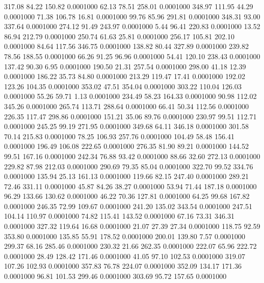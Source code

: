  317.08   84.22  150.82   0.0001000
  62.13   78.51  258.01   0.0001000
 348.97  111.95   44.29   0.0001000
  71.38  106.78   16.81   0.0001000
  99.76   85.96  291.81   0.0001000
 348.31   93.00  337.64   0.0001000
 274.12   91.49  243.97   0.0001000
   5.44   96.41  220.83   0.0001000
  13.52   86.94  212.79   0.0001000
 250.74   61.63   25.81   0.0001000
 256.17  105.81  202.10   0.0001000
  84.64  117.56  346.75   0.0001000
 138.82   80.44  327.89   0.0001000
 239.82   78.56  188.55   0.0001000
  66.26   91.25   96.96   0.0001000
  54.41  120.10  238.43   0.0001000
 137.42   90.30    6.95   0.0001000
 190.50   21.31  257.54   0.0001000
 298.00   41.18   12.39   0.0001000
 186.22   35.73   84.80   0.0001000
 213.29  119.47   17.41   0.0001000
 192.02  123.26  104.35   0.0001000
 353.02   47.51  354.04   0.0001000
 303.22  110.04  126.03   0.0001000
  55.26   59.71    1.13   0.0001000
 234.49   58.23  164.33   0.0001000
  90.98  112.02  345.26   0.0001000
 265.74  113.71  288.64   0.0001000
  66.41   50.34  112.56   0.0001000
 226.35  117.47  298.86   0.0001000
 151.21   35.06   89.76   0.0001000
 230.97   99.51  112.71   0.0001000
 245.25   99.19  271.95   0.0001000
 349.68   64.11  346.18   0.0001000
 301.58   70.14  215.83   0.0001000
  78.25  106.93  257.76   0.0001000
 104.49   58.48  156.41   0.0001000
 196.49  106.08  222.65   0.0001000
 276.35   81.90   89.21   0.0001000
 144.52   99.51  167.16   0.0001000
 242.34   76.88   93.42   0.0001000
  88.66   32.60  272.13   0.0001000
 229.82   87.98  212.03   0.0001000
 290.69   79.35   85.04   0.0001000
 322.70   99.52  334.76   0.0001000
 135.94   25.13  161.13   0.0001000
 119.66   82.15  247.40   0.0001000
 289.21   72.46  331.11   0.0001000
  45.87   84.26   38.27   0.0001000
  53.94   71.44  187.18   0.0001000
  96.29  133.66  130.62   0.0001000
  46.22   70.36  127.81   0.0001000
  64.25   99.68  167.82   0.0001000
 246.35   72.99  109.67   0.0001000
 241.20  135.02  343.54   0.0001000
 247.51  104.14  110.97   0.0001000
  74.82  115.41  143.52   0.0001000
  67.16   73.31  346.31   0.0001000
 327.32  119.64   16.68   0.0001000
  21.07   27.39   27.34   0.0001000
 118.75   92.59  353.80   0.0001000
 135.85   55.91  178.52   0.0001000
 200.01  139.80    7.57   0.0001000
 299.37   68.16  285.46   0.0001000
 230.32   21.66  262.35   0.0001000
 222.07   65.96  222.72   0.0001000
  28.49  128.42  171.46   0.0001000
  41.05   97.10  102.53   0.0001000
 319.07  107.26  102.93   0.0001000
 357.83   76.78  224.07   0.0001000
 352.09  134.17  171.36   0.0001000
  96.81  101.53  299.46   0.0001000
 303.69   95.72  157.65   0.0001000
